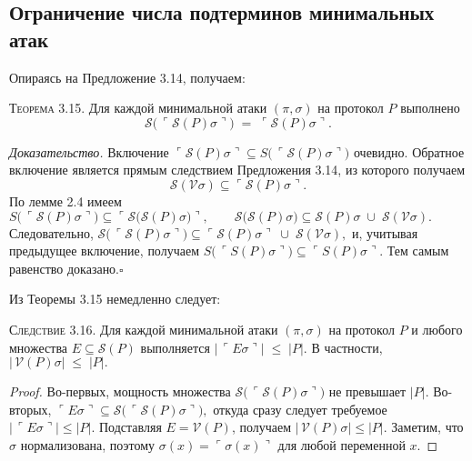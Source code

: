 \subsection{Ограничение числа подтерминов минимальных атак}

Опираясь на Предложение 3.14, получаем:

\textsc{Теорема 3.15.}
Для каждой минимальной атаки $(\pi,\sigma)$ на протокол $P$ выполнено
\[
  \mathcal S\!\bigl(\,\ulcorner \mathcal S(P)\sigma\urcorner\bigr)\;=\;
  \ulcorner \mathcal S(P)\sigma\urcorner.
\]

\textit{Доказательство.}
Включение
\(
  \ulcorner \mathcal S(P)\sigma\urcorner
  \subseteq
  S\!\bigl(\,\ulcorner \mathcal S(P)\sigma\urcorner\bigr)
\)
очевидно.
Обратное включение является прямым следствием
Предложения 3.14, из которого получаем
\[
  \mathcal S(\mathcal V\sigma)
  \subseteq
  \ulcorner \mathcal S(P)\sigma\urcorner.
\]
По лемме 2.4 имеем
\(
  S\!\bigl(\,\ulcorner \mathcal S(P)\sigma\urcorner\bigr)
    \subseteq
  \ulcorner \mathcal S\bigl(\mathcal S(P)\sigma\bigr)\urcorner,
  \qquad
  \mathcal S\bigl(\mathcal S(P)\sigma\bigr)
    \subseteq
  \mathcal S(P)\sigma\;\cup\; \mathcal S(\mathcal V\sigma).
\)
Следовательно,
\(
  \mathcal S\!\bigl(\,\ulcorner \mathcal S(P)\sigma\urcorner\bigr)
    \subseteq
  \ulcorner \mathcal S(P)\sigma\urcorner
  \;\cup\;
  \mathcal S(\mathcal V\sigma),
\)
и, учитывая предыдущее включение,
получаем
\(
  S\!\bigl(\,\ulcorner S(P)\sigma\urcorner\bigr)
    \subseteq
  \ulcorner S(P)\sigma\urcorner.
\)
Тем самым равенство доказано.\hfill$\square$

Из Теоремы 3.15 немедленно следует:

\textsc{Следствие 3.16.}
Для каждой минимальной атаки $(\pi,\sigma)$ на протокол $P$
и любого множества $E\subseteq \mathcal S(P)$ выполняется
\(
  \bigl|\,\ulcorner E\sigma\urcorner\bigr|\;\le\;|P|.
\)
В частности,
\(
  |\,\mathcal V(P)\sigma|\;\le\;|P|.
\)

\begin{proof}
Во-первых, мощность множества
\(\mathcal S\!\bigl(\,\ulcorner \mathcal S(P)\sigma\urcorner\bigr)\)
не превышает $|P|$.
Во-вторых,
\(
  \ulcorner E\sigma\urcorner
  \subseteq
  \mathcal S\!\bigl(\,\ulcorner \mathcal S(P)\sigma\urcorner\bigr),
\)
откуда сразу следует требуемое
\(
  \bigl|\,\ulcorner E\sigma\urcorner\bigr|\le|P|.
\)
Подставляя $E=\mathcal V(P)$, получаем
\(
  |\,\mathcal V(P)\sigma|\le|P|.
\)
Заметим, что $\sigma$ нормализована, поэтому
\(
  \sigma(x)=\ulcorner\sigma(x)\urcorner
\)
для любой переменной $x$.
\end{proof}

